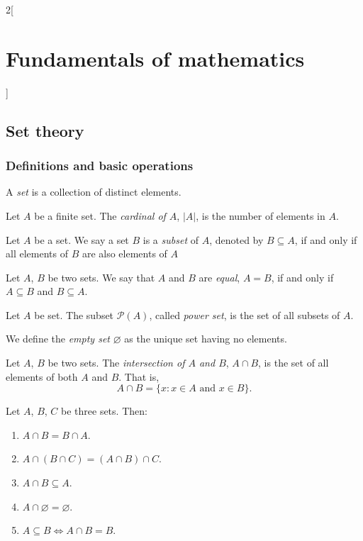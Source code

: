 \documentclass[../../../main.tex]{subfiles}
\begin{document}
\begin{multicols}{2}[\section{Fundamentals of mathematics}]
\subsection{Set theory}
\subsubsection*{Definitions and basic operations}
\begin{definition}
    A \textit{set} is a collection of distinct elements.
\end{definition}
\begin{definition}
    Let $A$ be a finite set. The \textit{cardinal of $A$}, $|A|$, is the number of elements in $A$.
\end{definition}
\begin{definition}
    Let $A$ be a set. We say a set $B$ is a \textit{subset} of $A$, denoted by $B\subseteq A$, if and only if all elements of $B$ are also elements of $A$
\end{definition}
\begin{definition}
    Let $A$, $B$ be two sets. We say that $A$ and $B$ are \textit{equal}, $A=B$, if and only if $A\subseteq B$ and $B\subseteq A$.
\end{definition}
\begin{definition}
    Let $A$ be set. The subset $\mathcal{P}(A)$, called \textit{power set}, is the set of all subsets of $A$.
\end{definition}
\begin{definition}
    We define the \textit{empty set} $\varnothing$ as the unique set having no elements.
\end{definition}
\begin{definition}
    Let $A$, $B$ be two sets. The \textit{intersection of $A$ and $B$}, $A\cap B$, is the set of all elements of both $A$ and $B$. That is, $$A\cap B=\{x:x\in A\text{ and }x\in B\}.$$
\end{definition}
\begin{prop}
    Let $A$, $B$, $C$ be three sets. Then:
    \begin{enumerate}
        \item $A\cap B=B\cap A$.
        \item $A\cap(B\cap C)=(A\cap B)\cap C$.
        \item $A\cap B\subseteq A$.
        \item $A\cap\varnothing=\varnothing$.
        \item $A\subseteq B\iff A\cap B=B$.

\end{enumerate}
\end{prop}
\end{multicols}
\end{document}
